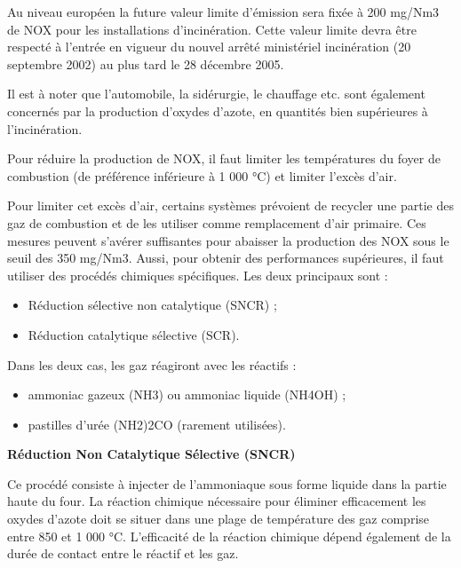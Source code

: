 Au niveau européen la future valeur limite d’émission sera fixée à 200 mg/Nm3 de NOX pour les installations d’incinération. Cette valeur limite devra être respecté à l’entrée en vigueur du nouvel arrêté ministériel incinération (20 septembre 2002) au plus tard le 28 décembre 2005.
\vspace{0.3cm}

Il est à noter que l’automobile, la sidérurgie, le chauffage etc. sont également concernés par la production d’oxydes d’azote, en quantités bien supérieures à l’incinération.

\vspace{0.3cm}

Pour réduire la production de NOX, il faut limiter les températures du foyer de combustion (de préférence inférieure à 1 000 °C) et limiter l’excès d’air. 
\vspace{0.3cm}

Pour limiter cet excès d’air, certains systèmes prévoient de recycler une partie des gaz de combustion et de les utiliser comme remplacement d’air primaire. 
Ces mesures peuvent s’avérer suffisantes pour abaisser la production des NOX sous le seuil des 350 mg/Nm3. Aussi, pour obtenir des performances supérieures, il faut utiliser des procédés chimiques spécifiques. Les deux principaux sont :

\begin{itemize}
   \item Réduction sélective non catalytique (SNCR) ;
   \item Réduction catalytique sélective (SCR).
\end{itemize}

Dans les deux cas, les gaz réagiront avec les réactifs :
\begin{itemize}
   \item ammoniac gazeux (NH3) ou ammoniac liquide (NH4OH) ;
   \item pastilles d'urée (NH2)2CO (rarement utilisées).
\end{itemize}

 \vspace{0.3cm}
\textbf{Réduction Non Catalytique Sélective (SNCR)}
\vspace{0.3cm}

Ce procédé consiste à injecter de l’ammoniaque sous forme liquide dans la partie haute du four. La réaction chimique nécessaire pour éliminer efficacement les oxydes d’azote doit se situer dans une plage de température des gaz comprise entre 850 et 1 000 °C. L’efficacité de la réaction chimique dépend également de la durée de contact entre le réactif et les gaz.
\vspace{0.3cm}

